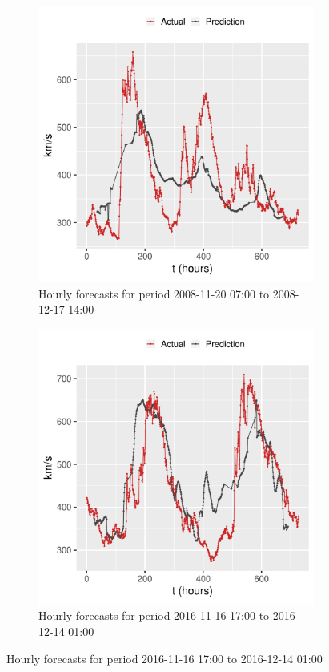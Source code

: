 \begin{figure}[!htb]
  \centering

  \begin{subfigure}[b]{0.4\textwidth}
    \centering
    \includegraphics[width=\textwidth]{figures/test_2008-11-20_2008-12-20_ts}
    \caption{Hourly forecasts for period 2008-11-20 07:00 to 2008-12-17 14:00}
    \label{fig:problemsw_ts1}
  \end{subfigure}
  \hfill
  \begin{subfigure}[b]{0.4\textwidth}
    \centering
    \includegraphics[width=\textwidth]{figures/test_2016-11-16_2016-12-17_ts}
    \caption{ Hourly forecasts for period 2016-11-16 17:00 to 2016-12-14 01:00}
    \label{fig:problemsw_ts2}
  \end{subfigure}
  

\end{figure}
